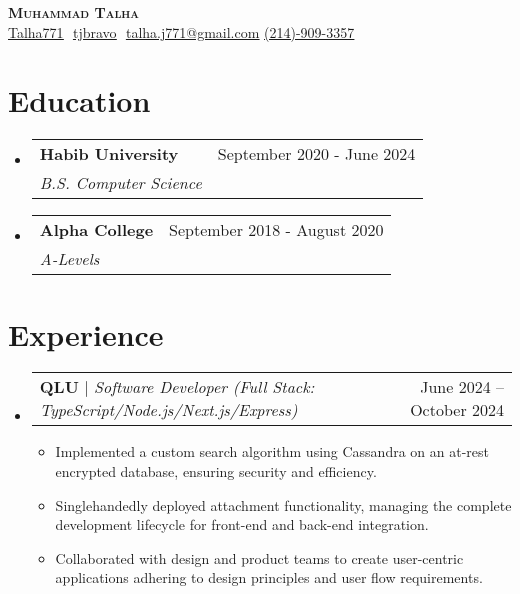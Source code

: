 \documentclass{article}
\makeatletter
\newcommand{\resumeSubheading}[4]{
  \vspace{-2pt}\item
    \begin{tabular*}{0.97\textwidth}[t]{l@{\extracolsep{\fill}}r}
      \textbf{#1} & #2 \\
      \textit{\small#3} & \textit{\small #4} \\
    \end{tabular*}\vspace{-7pt}
}
\newcommand{\resumeProjectHeading}[2]{
    \item
    \begin{tabular*}{0.97\textwidth}{l@{\extracolsep{\fill}}r}
      \small#1 & #2 \\
    \end{tabular*}\vspace{-7pt}
}
\newcommand{\resumeSubHeadingListStart}{\begin{itemize}[leftmargin=0.15in, label={}]}
\newcommand{\resumeSubHeadingListEnd}{\end{itemize}}
\makeatother
\begin{document}
\begin{description}
    \item 
        \begin{center}
            \textbf{\Huge \scshape Muhammad Talha} \\ \vspace{8pt}
            \small 
            \href{https://github.com/Talha771}
            {\underline{Talha771}} $  $
            \href{https://linkedin.com/in/tjbravo}{\underline{tjbravo}} $  $
            \href{mailto:talha.j771@gmail.com}
            {\underline{talha.j771@gmail.com}}
            \href{tel:(214)9093357}{\underline{(214)-909-3357}}
        \end{center}
\end{description}


\section{Education}
\resumeSubHeadingListStart

    \resumeSubheading
      {Habib University}{September 2020 - June 2024}
      {B.S. Computer Science}{}
    \resumeSubheading
      {Alpha College}{September 2018 - August 2020}
      {A-Levels}{}
\resumeSubHeadingListEnd


\section{Experience}
\resumeSubHeadingListStart

    \resumeProjectHeading
    {\textbf{QLU}\vspace{8pt} $|$ \footnotesize\emph{Software Developer (Full Stack: TypeScript/Node.js/Next.js/Express)}}{June 2024 -- October 2024}
    \begin{itemize}
        \item Implemented a custom search algorithm using Cassandra on an at-rest encrypted database, ensuring security and efficiency.
        \item Singlehandedly deployed attachment functionality, managing the complete development lifecycle for front-end and back-end integration.
        \item Collaborated with design and product teams to create user-centric applications adhering to design principles and user flow requirements.
    \end{itemize}
\resumeSubHeadingListEnd
\end{document}
